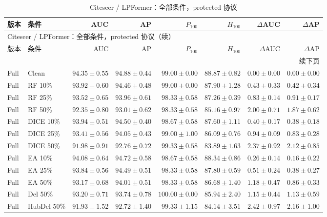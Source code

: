 {\footnotesize
\setlength{\tabcolsep}{3.2pt}
\renewcommand{\arraystretch}{1.10}
\begin{longtable}{llrrrrrr}
\caption{Citeseer / LPFormer：全部条件，protected 协议}\\
\toprule
版本 & 条件 & AUC & AP & $P_{100}$ & $H_{100}$ & $\Delta$AUC & $\Delta$AP \\
\midrule
\endfirsthead
\multicolumn{8}{l}{Citeseer / LPFormer：全部条件，protected 协议（续）}\\
\toprule
版本 & 条件 & AUC & AP & $P_{100}$ & $H_{100}$ & $\Delta$AUC & $\Delta$AP \\
\midrule
\endhead
\midrule\multicolumn{8}{r}{续下页}\\
\endfoot
\bottomrule
\endlastfoot
Full & Clean & $94.35\pm0.55$ & $94.88\pm0.44$ & $99.00\pm0.00$ & $88.87\pm0.82$ & $0.00\pm0.00$ & $0.00\pm0.00$ \\
Full & RF 10\% & $93.92\pm0.60$ & $94.46\pm0.48$ & $99.00\pm0.00$ & $87.90\pm1.28$ & $0.43\pm0.33$ & $0.42\pm0.34$ \\
Full & RF 25\% & $93.52\pm0.65$ & $93.96\pm0.61$ & $98.33\pm0.58$ & $87.26\pm0.39$ & $0.83\pm0.14$ & $0.91\pm0.17$ \\
Full & RF 50\% & $92.35\pm0.80$ & $93.01\pm0.62$ & $98.33\pm0.58$ & $85.16\pm0.97$ & $2.00\pm0.71$ & $1.87\pm0.62$ \\
Full & DICE 10\% & $93.94\pm0.51$ & $94.50\pm0.40$ & $98.67\pm0.58$ & $87.60\pm1.11$ & $0.40\pm0.17$ & $0.38\pm0.18$ \\
Full & DICE 25\% & $93.41\pm0.56$ & $94.05\pm0.43$ & $99.00\pm1.00$ & $86.09\pm0.76$ & $0.94\pm0.09$ & $0.83\pm0.28$ \\
Full & DICE 50\% & $91.98\pm0.91$ & $92.76\pm0.72$ & $99.33\pm0.58$ & $83.89\pm1.63$ & $2.37\pm0.92$ & $2.12\pm0.85$ \\
Full & EA 10\% & $94.08\pm0.64$ & $94.72\pm0.58$ & $98.67\pm0.58$ & $88.34\pm0.86$ & $0.26\pm0.14$ & $0.16\pm0.22$ \\
Full & EA 25\% & $93.84\pm0.56$ & $94.49\pm0.51$ & $98.33\pm0.58$ & $87.80\pm0.59$ & $0.51\pm0.24$ & $0.38\pm0.27$ \\
Full & EA 50\% & $93.17\pm0.68$ & $94.01\pm0.51$ & $98.33\pm0.58$ & $86.68\pm1.40$ & $1.18\pm0.47$ & $0.86\pm0.33$ \\
Full & Del 50\% & $93.20\pm0.71$ & $93.74\pm0.78$ & $100.00\pm0.00$ & $85.94\pm2.40$ & $1.15\pm0.44$ & $1.13\pm0.59$ \\
Full & HubDel 50\% & $91.93\pm1.52$ & $92.72\pm1.40$ & $99.33\pm1.15$ & $84.14\pm3.51$ & $2.42\pm0.97$ & $2.16\pm1.00$ \\

\end{longtable}}

